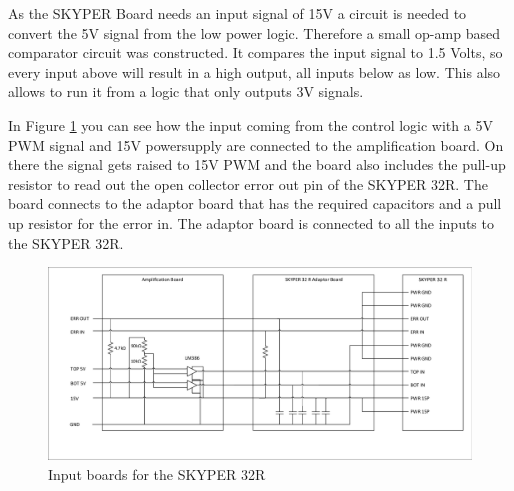 As the SKYPER Board needs an input signal of 15V a circuit is needed to convert the 5V signal from the low power logic.
Therefore a small op-amp based comparator circuit was constructed.
It compares the input signal to 1.5 Volts, so every input above will result in a high output,
all inputs below as low.
This also allows to run it from a logic that only outputs 3V signals.

In Figure \ref{fig:Skyper32in} you can see how the input coming from the control logic with a 5V PWM signal and 15V powersupply are connected to the amplification board.
On there the signal gets raised to 15V PWM and the board also includes the pull-up resistor to read out the open collector error out pin of the SKYPER 32R. The board connects to the adaptor board that has the required capacitors and a pull up resistor for the error in. The adaptor board is connected to all the inputs to the SKYPER 32R.

\begin{figure}[H]
   \centering
   \includegraphics[width=\textwidth]{figures/Skyperboard/Skyper32in.pdf}
    \caption{Input boards for the SKYPER 32R}
	\label{fig:Skyper32in}
\end{figure}
\clearpage